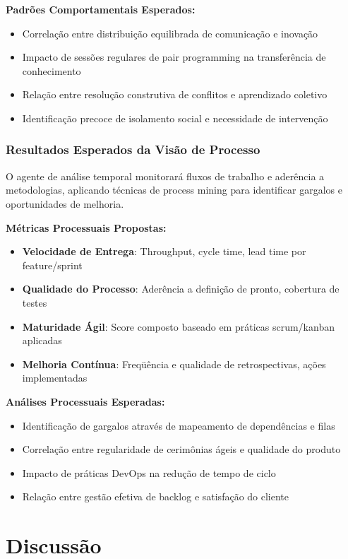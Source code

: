 \documentclass[english, spanish, brazilian]{modelo_dt}
\begin{document}
\textbf{Padrões Comportamentais Esperados:}
\begin{itemize}
\item Correlação entre distribuição equilibrada de comunicação e inovação
\item Impacto de sessões regulares de pair programming na transferência de conhecimento
\item Relação entre resolução construtiva de conflitos e aprendizado coletivo
\item Identificação precoce de isolamento social e necessidade de intervenção
\end{itemize}

\subsubsection{Resultados Esperados da Visão de Processo}

O agente de análise temporal monitorará fluxos de trabalho e aderência a metodologias, aplicando técnicas de process mining para identificar gargalos e oportunidades de melhoria.

\textbf{Métricas Processuais Propostas:}
\begin{itemize}
\item \textbf{Velocidade de Entrega}: Throughput, cycle time, lead time por feature/sprint
\item \textbf{Qualidade do Processo}: Aderência a definição de pronto, cobertura de testes
\item \textbf{Maturidade Ágil}: Score composto baseado em práticas scrum/kanban aplicadas
\item \textbf{Melhoria Contínua}: Freqüência e qualidade de retrospectivas, ações implementadas
\end{itemize}

\textbf{Análises Processuais Esperadas:}
\begin{itemize}
\item Identificação de gargalos através de mapeamento de dependências e filas
\item Correlação entre regularidade de cerimônias ágeis e qualidade do produto
\item Impacto de práticas DevOps na redução de tempo de ciclo
\item Relação entre gestão efetiva de backlog e satisfação do cliente
\end{itemize}

\section{Discussão}
\end{document}
